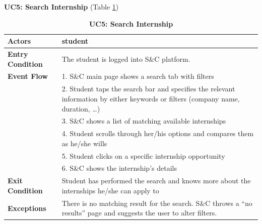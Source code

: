 \textbf{UC5: Search Internship }(Table \ref{tab:UC5})
\begin{table}[H]
\centering
\caption{\textbf{UC5: Search Internship}}
\label{tab:UC5}
\begin{tabularx}{\textwidth}{|X|X|}
\hline
\textbf{Actors}           & student                                                   \\ \hline
\textbf{Entry Condition}   & The student is logged into S\&C platform.                  \\ \hline
\textbf{Event Flow}        & 1. S\&C main page shows a search tab with filters            \\
                           & 2. Student taps the search bar and specifies the relevant information by either keywords or filters (company name, duration, …) \\
                           & 3. S\&C shows a list of matching available internships      \\
                           & 4. Student scrolls through her/his options and compares them as he/she wills \\
                           & 5. Student clicks on a specific internship opportunity      \\
                           & 6. S\&C shows the internship’s details                      \\ \hline
\textbf{Exit Condition}    & Student has performed the search and knows more about the internships he/she can apply to \\ \hline
\textbf{Exceptions}        & There is no matching result for the search. S\&C throws a “no results” page and suggests the user to alter filters. \\ \hline
\end{tabularx}
\end{table}

